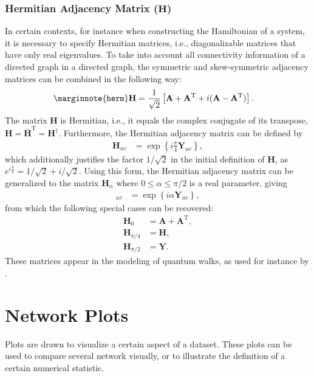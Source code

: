\documentclass{article}
\begin{document}
\subsubsection{Hermitian Adjacency Matrix ($\mathbf H$)}
In certain contexts, for instance when constructing the Hamiltonian of a
system, it is necessary to specify Hermitian matrices, i.e.,
diagonalizable matrices that have only real eigenvalues.  To take into
account all connectivity information of a directed graph in a
directed graph, the symmetric and skew-symmetric adjacency matrices can
be combined in the following way:
\begin{align}
  \marginnote{\texttt{herm}}
  \mathbf H &= \frac 1 {\sqrt 2} \left[
  \mathbf A + \mathbf A^{\mathrm T} + i(\mathbf A - \mathbf A^{\mathrm T})
  \right]. 
\end{align}
The matrix $\mathbf H$ is Hermitian, i.e., it equals the complex
conjugate of its transpose, $\mathbf H = \mathbf {\bar H}^{\mathrm T} =
\mathbf H^{\dagger}$.
Furthermore, the Hermitian adjacency matrix can be defined by
\begin{align}
  \mathbf H_{uv} &= \exp\left\{i \frac \pi 4 \mathbf Y_{uv}\right\},
\end{align}
which additionally justifies the factor $1/\sqrt 2$ in the initial
definition of $\mathbf H$, as $e^{i \frac \pi 4} = 1/\sqrt 2 + i/\sqrt
2$.  Using this form, the Hermitian adjacency matrix can be generalized
to the matrix $\mathbf H_\alpha$ where $0 \leq \alpha \leq \pi/2$ is a
real parameter, giving 
\begin{align}
  [\mathbf H_{\alpha}]_{uv} &= \exp\left\{i \alpha \mathbf Y_{uv} \right\},  
\end{align}
from which the following special cases can be recovered:
\begin{align}
  \mathbf H_0 &= \mathbf A + \mathbf A^{\mathrm T}, \\
  \mathbf H_{\pi/4} &= \mathbf H, \\
  \mathbf H_{\pi/2} &= \mathbf Y.
\end{align}
These matrices appear in the modeling of quantum walks, as used for
instance by \cite{toedtli:ctqw}.  

\section{Network Plots}
\label{sec:plots}
Plots are drawn to visualize a certain aspect of a dataset. These plots
can be used to compare several network visually, or to illustrate the
definition of a certain numerical statistic.
\end{document}
